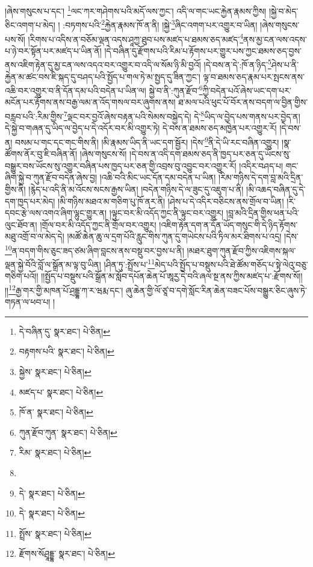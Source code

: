 །ཞེས་གསུངས་པ་དང་། \footnote{དེ་བཞིན་དུ་  སྣར་ཐང་།  པེ་ཅིན། }ལང་ཀར་གཤེགས་པའི་མདོ་ལས་ཀྱང་། འདི་ལ་གང་ཡང་རྐྱེན་རྣམས་ཀྱིས། །སྐྱེ་བ་མེད་ཅིང་འགག་པ་མེད། །
:བཏགས་པའི་\footnote{བརྟགས་པའི་  སྣར་ཐང་།  པེ་ཅིན། }རྐྱེན་རྣམས་ཁོ་ན་ནི། །སྐྱེ་\footnote{སྐྱེས་  སྣར་ཐང་།  པེ་ཅིན། }ཞིང་འགག་པར་འགྱུར་བ་ཡིན། །ཞེས་གསུངས་པས་སོ། །རིགས་པ་འདིས་ན་བཅོམ་ལྡན་འདས་ཤཱཀྱ་ཐུབ་པས་མཛད་པ་ཐམས་ཅད་མཛད་\footnote{མཛད་པ་  སྣར་ཐང་།  པེ་ཅིན། }ནས་མྱ་ངན་ལས་འདས་པ་ཉེ་བར་སྟོན་པར་མཛད་པ་ཡིན་ནོ། །དེ་བཞིན་དུ་རྫོགས་པའི་རིམ་པ་རྟོགས་པར་གྱུར་པས་ཀྱང་ཐམས་ཅད་བྱས་ནས་འཇིག་རྟེན་དུ་མྱ་ངན་ལས་འདའ་བར་འགྱུར་བ་འདི་ལ་སོམ་ཉི་མི་བྱའོ། །དེ་བས་ན་དེ་:ཁོ་ན་ཉིད་\footnote{ཁོ་ན་  སྣར་ཐང་།  པེ་ཅིན། }ཤེས་པ་ནི་རྐྱེན་མ་ཚང་བས་ཇི་སྐད་དུ་བཤད་པའི་སྤྱོད་པ་གལ་ཏེ་མ་སྤྱད་དུ་ཟིན་ཀྱང་། ལྟ་བ་ཐམས་ཅད་རྣམ་པར་སྤངས་ནས་འཆི་བར་འགྱུར་བ་ནི་དོན་དམ་པའི་བདེན་པ་ཡིན་ལ། སྐྱེ་བ་ནི་:ཀུན་རྫོབ་\footnote{ཀུན་རྫོབ་ཀུན་  སྣར་ཐང་།  པེ་ཅིན། }ཀྱི་བདེན་པའོ་ཞེས་ཡང་དག་པར་མངོན་པར་རྟོགས་ནས་བརྒྱ་ལམ་ན་འོད་གསལ་བར་ཞུགས་ནས། ཐ་མལ་པའི་ཕུང་པོ་བོར་ནས་བདག་ལ་བྱིན་གྱིས་བརླབ་པའི་:རིམ་གྱིས་\footnote{རིམ་  སྣར་ཐང་།  པེ་ཅིན། }ལྡང་བར་བྱའོ་ཞེས་བརྟན་པའི་སེམས་བསྐྱེད་དེ། དེ་\footnote{}ཡིད་ལ་བྱེད་པས་གནས་པར་བྱེད་ན། དེ་སྐྱེ་བ་གཞན་དུ་ཡིད་ལ་བྱེད་པ་དེ་འདོར་བར་མི་འགྱུར་ཏེ། དེ་བས་ན་ཐམས་ཅད་མཁྱེན་པར་འགྱུར་རོ། །དེ་བས་ན། བསམ་པ་གང་དང་གང་གིས་ནི། །མི་རྣམས་ཡིད་ནི་ཡང་དག་སྦྱོར། །དེས་\footnote{དེ་  སྣར་ཐང་།  པེ་ཅིན། }ནི་དེ་ཡི་རང་བཞིན་འགྱུར། །སྣ་ཚོགས་ནོར་བུ་ཇི་བཞིན་ནོ། །ཞེས་གསུངས་སོ། །དེ་བས་ན་འདི་དག་ཐམས་ཅད་ནི་ཁྱད་པར་ཅན་དུ་ཡོངས་སུ་བསྒྱུར་བས་ཡོངས་སུ་འགྱུར་བཞིན་པས་ཁྱད་པར་ཅན་གྱི་འབྲས་བུ་འབྱུང་བར་འགྱུར་རོ། །འདིར་བཤད་པ། གང་ཞིག་སྐྱེ་བ་ཀུན་རྫོབ་བདེན་ཞེས་བྱ། །འཆི་བའི་མིང་ཡང་དོན་དམ་བདེན་པ་ཡིན། །རིམ་གཉིས་དེ་དག་བླ་མའི་དྲིན་གྱིས་ནི། །རྙེད་པ་འདི་ནི་མ་འོངས་སངས་རྒྱས་ཡིན། །བདེན་གཉིས་དེ་ལ་ཟུང་དུ་འཇུག་པ་ནི། །མི་འཆད་བཞིན་དུ་དེ་དག་ཁྱད་པར་མེད། །མི་གཉིས་མཐའ་མ་གཅིག་པུ་ཁོ་ནར་ནི། །ཤེས་པ་དེ་འདིར་བཅིངས་ནས་གྲོལ་བ་ཡིན། །རི་དབང་རྩེ་ལས་འགའ་ཞིག་ལྷུང་གྱུར་ན། །ལྟུང་བར་མི་འདོད་ཀྱང་ནི་ལྟུང་བར་འགྱུར། །བླ་མའི་དྲིན་གྱིས་ཕན་པའི་ལུང་ཐོབ་ན། །གྲོལ་བར་མི་འདོད་ཀྱང་ནི་གྲོལ་བར་འགྱུར། །འཇིག་རྟེན་དག་ན་དོན་ཡོད་གསུང་གི་དེ་ཉིད་རྟོགས་མཐུ་འགྲོ་བ་ལ་མེད་དེ། །མཚོ་ཆེན་ཆུ་ལ་དྲག་པོའི་རླུང་གིས་ཀུན་དུ་གཡེངས་པའི་ཏིལ་མར་ཐིགས་པ་འདྲ། །དེས་\footnote{དེ་  སྣར་ཐང་།  པེ་ཅིན། }ན་བདག་གིས་ཅུང་ཟད་ཙམ་ཞིག་བླངས་ནས་བསྡུ་བར་བྱས་པ་ནི། །མཐར་ཐུག་ཀུན་རྫོབ་ཀྱིས་འཇིགས་སྐལ་ལྡན་སྐྱེ་བོའི་བློ་ལ་སྒྲོན་མ་ལྟ་བུ་ཡིན། །ཤིན་ཏུ་:སྤྲོས་པ་\footnote{སྤྲོས་  སྣར་ཐང་།  པེ་ཅིན། }མེད་པའི་སྤྱོད་པ་བསྡུས་པའི་ཐེ་ཚོམ་གཅོད་པ་སྟེ་ལེའུ་བཅུ་གཅིག་པའོ།། །།སྤྱོད་པ་བསྡུས་པའི་སྒྲོན་མ་སློབ་དཔོན་ཆེན་པོ་ཨཱརྱ་དེ་བའི་ཞལ་སྔ་ནས་ཀྱིས་མཛད་པ་:རྫོགས་སོ།། །།\footnote{རྫོགས་སོཤྲཱདྡྷ་  སྣར་ཐང་།  པེ་ཅིན། }རྒྱ་གར་གྱི་མཁན་པོ་ཤྲདྡྷ་ཀ་ར་ཝརྨ་དང་། ཞུ་ཆེན་གྱི་ལོ་ཙཱ་བ་དགེ་སློང་རིན་ཆེན་བཟང་པོས་བསྒྱུར་ཅིང་ཞུས་ཏེ་གཏན་ལ་ཕབ་པ། ། 